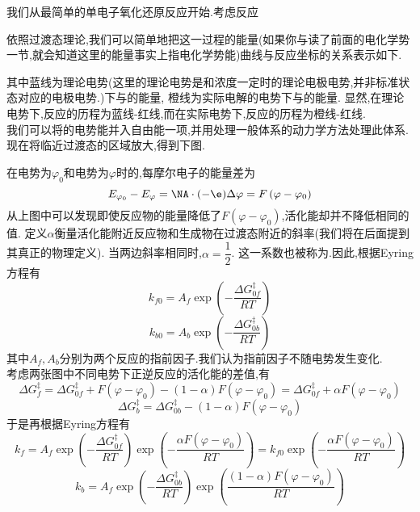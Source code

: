 \documentclass{ctexart}
\begin{document}
\begin{derivation}
    我们从最简单的单电子氧化还原反应开始.考虑反应
    \begin{tightcenter}
    \end{tightcenter}
    依照过渡态理论,我们可以简单地把这一过程的能量(如果你与读了前面的电化学势一节,就会知道这里的能量事实上指电化学势能)曲线与反应坐标的关系表示如下.
    \begin{center}
        
    \end{center}
    其中蓝线为理论电势(这里的理论电势是和浓度一定时的理论电极电势,并非标准状态对应的电极电势.)下与的能量,%
    橙线为实际电解的电势下与的能量.%
    显然,在理论电势下,反应的历程为蓝线-红线,而在实际电势下,反应的历程为橙线-红线.\\
    我们可以将的电势能并入自由能一项,并用处理一般体系的动力学方法处理此体系.\\
    现在将临近过渡态的区域放大,得到下图.
    \begin{center}
        
    \end{center}
    在电势为$\varphi_0$和电势为$\varphi$时的,每摩尔电子的能量差为
    \[E_{\varphi_0}-E_{\varphi}=\NA\cdot(-\e)\Delta\varphi=F\left(\varphi-\varphi_0\right)\]
    从上图中可以发现即使反应物的能量降低了$F\left(\varphi-\varphi_0\right)$,活化能却并不降低相同的值.%
    定义$\alpha$衡量活化能附近反应物和生成物在过渡态附近的斜率(我们将在后面提到其真正的物理定义).%
    当两边斜率相同时,$\alpha=\dfrac12$.%
    这一系数也被称为.因此,根据Eyring方程有
    \[k_{f0}=A_f\exp\left(-\dfrac{\Delta G_{0f}^\ddagger}{RT}\right)\]
    \[k_{b0}=A_b\exp\left(-\dfrac{\Delta G_{0b}^\ddagger}{RT}\right)\]
    其中$A_f,A_b$分别为两个反应的指前因子.我们认为指前因子不随电势发生变化.\\
    考虑两张图中不同电势下正逆反应的活化能的差值,有
    \[\Delta G_{f}^\ddagger=\Delta G_{0f}^\ddagger+F\left(\varphi-\varphi_0\right)-(1-\alpha)F\left(\varphi-\varphi_0\right)
    =\Delta G_{0f}^\ddagger+\alpha F\left(\varphi-\varphi_0\right)\]
    \[\Delta G_{b}^\ddagger=\Delta G_{0b}^\ddagger-(1-\alpha)F\left(\varphi-\varphi_0\right)\]
    于是再根据Eyring方程有
    \[k_f=A_f\exp\left(-\dfrac{\Delta G_{0f}^\ddagger}{RT}\right)\exp\left(-\dfrac{\alpha F\left(\varphi-\varphi_0\right)}{RT}\right)
    =k_{f0}\exp\left(-\dfrac{\alpha F\left(\varphi-\varphi_0\right)}{RT}\right)\]
    \[k_b=A_f\exp\left(-\dfrac{\Delta G_{0b}^\ddagger}{RT}\right)\exp\left(\dfrac{(1-\alpha)F\left(\varphi-\varphi_0\right)}{RT}\right)
\]
\end{derivation}
\end{document}

